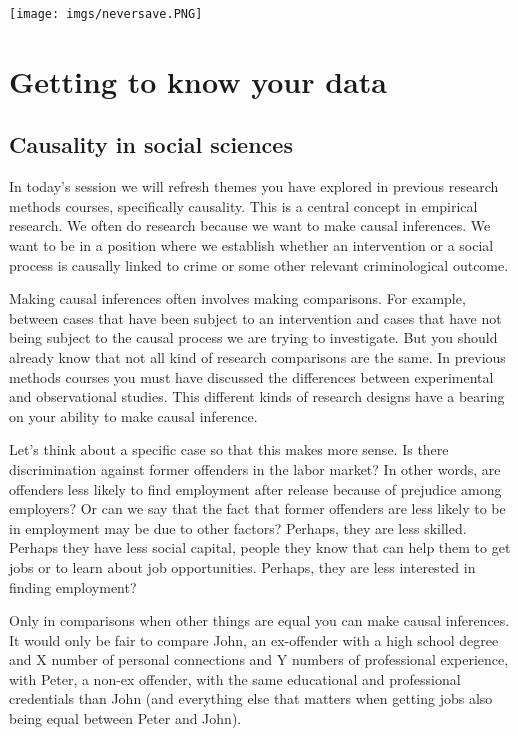\documentclass[
]{book}
\begin{document}
\texttt{[image: imgs/neversave.PNG]}

\hypertarget{getting-to-know-your-data}{%
\chapter{Getting to know your data}\label{getting-to-know-your-data}}

\hypertarget{causality-in-social-sciences}{%
\section{Causality in social sciences}\label{causality-in-social-sciences}}

In today's session we will refresh themes you have explored in previous research methods courses, specifically causality. This is a central concept in empirical research. We often do research because we want to make causal inferences. We want to be in a position where we establish whether an intervention or a social process is causally linked to crime or some other relevant criminological outcome.

Making causal inferences often involves making comparisons. For example, between cases that have been subject to an intervention and cases that have not being subject to the causal process we are trying to investigate. But you should already know that not all kind of research comparisons are the same. In previous methods courses you must have discussed the differences between experimental and observational studies. This different kinds of research designs have a bearing on your ability to make causal inference.

Let's think about a specific case so that this makes more sense. Is there discrimination against former offenders in the labor market? In other words, are offenders less likely to find employment after release because of prejudice among employers? Or can we say that the fact that former offenders are less likely to be in employment may be due to other factors? Perhaps, they are less skilled. Perhaps they have less social capital, people they know that can help them to get jobs or to learn about job opportunities. Perhaps, they are less interested in finding employment?

Only in comparisons when other things are equal you can make causal inferences. It would only be fair to compare John, an ex-offender with a high school degree and X number of personal connections and Y numbers of professional experience, with Peter, a non-ex offender, with the same educational and professional credentials than John (and everything else that matters when getting jobs also being equal between Peter and John).
\end{document}
